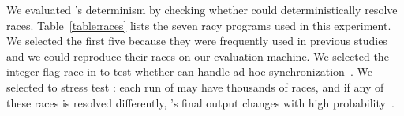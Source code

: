 




We evaluated \peregrine's determinism by checking whether \peregrine could
deterministically resolve races.  Table~\ref{table:races} lists the seven
racy programs used in this experiment.  We selected the first five because
they were frequently used in previous
studies~\cite{avio:asplos06,ctrigger:asplos09,lu:concurrency-bugs,pres:sosp09}
and we could reproduce their races on our evaluation machine.  We selected the
integer flag race in \parsec to test whether \peregrine can handle ad hoc
synchronization~\cite{syncfinder:osdi10}.  We selected \racey to stress
test \peregrine: each run of \racey may have thousands of races, and if any of
these races is resolved differently, \racey's final output changes
with high probability~\cite{racy-stress}.

